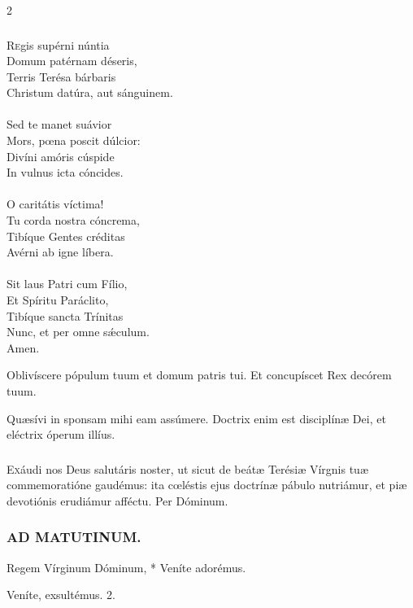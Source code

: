 \documentclass[9pt,twoside]{extarticle}
\begin{document}
\begin{multicols}{2}
\subsubsection*{\center {}}
\begin{center}\end{center}
\lettrine{R}egis supérni núntia\\
Domum patérnam déseris,\\
Terris Terésa bárbaris\\
Christum datúra, aut sánguinem.\\
\\
Sed te manet suávior\\
Mors, pœna poscit dúlcior:\\
Divíni amóris cúspide\\
In vulnus icta cóncides.\\
\\
O caritátis víctima!\\
Tu corda nostra cóncrema,\\
Tibíque Gentes créditas\\
Avérni ab igne líbera.\\
\\
Sit laus Patri cum Fílio,\\
Et Spíritu Paráclito,\\
Tibíque sancta Trínitas\\
Nunc, et per omne sǽculum.\\
Amen.

\begin{tightlist}{}
\item {} Oblivíscere pópulum tuum et domum patris tui.  Et concupíscet Rex decórem tuum.
\item {} Quæsívi in sponsam mihi eam assúmere. Doctrix enim est disciplínæ Dei, et eléctrix óperum illíus.
\end{tightlist}

\subsubsection*{\center {}}
\lettrine{E}xáudi nos Deus salutáris noster, ut sicut de beátæ Terésiæ Vírgnis tuæ commemoratióne gaudémus: ita cœléstis ejus doctrínæ pábulo nutriámur, et piæ devotiónis erudiámur afféctu. Per Dóminum.

\subsubsection*{\center \textsc{AD MATUTINUM.}}
\begin{tightlist}{}
\item {} Regem Vírginum Dóminum, * Veníte adorémus.
\item {} Veníte, exsultémus. 2.
\item {}
\end{tightlist}


\end{multicols}
\end{document}
